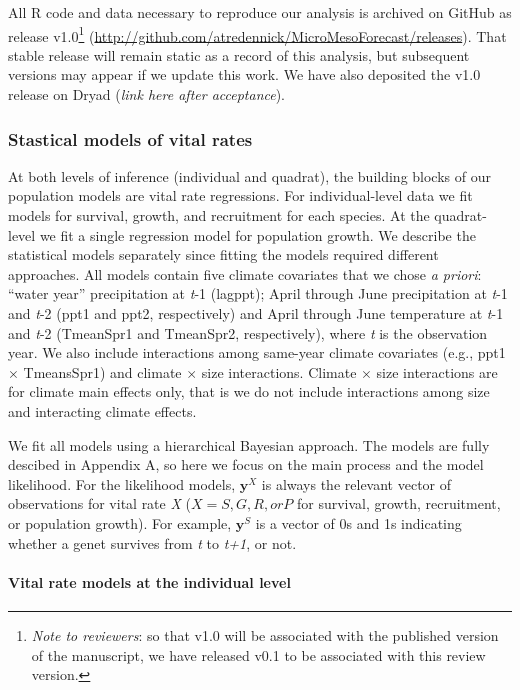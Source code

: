 \documentclass[12pt,]{article}
\begin{document}
All R code and data necessary to reproduce our analysis is archived on
GitHub as release v1.0\footnote{\emph{Note to reviewers}: so that v1.0
  will be associated with the published version of the manuscript, we
  have released v0.1 to be associated with this review version.}
(\url{http://github.com/atredennick/MicroMesoForecast/releases}). That
stable release will remain static as a record of this analysis, but
subsequent versions may appear if we update this work. We have also
deposited the v1.0 release on Dryad (\emph{link here after acceptance}).

\subsubsection{Stastical models of vital
rates}\label{stastical-models-of-vital-rates}

At both levels of inference (individual and quadrat), the building
blocks of our population models are vital rate regressions. For
individual-level data we fit models for survival, growth, and
recruitment for each species. At the quadrat-level we fit a single
regression model for population growth. We describe the statistical
models separately since fitting the models required different
approaches. All models contain five climate covariates that we chose
\emph{a priori}: ``water year'' precipitation at \emph{t}-1 (lagppt);
April through June precipitation at \emph{t}-1 and \emph{t}-2 (ppt1 and
ppt2, respectively) and April through June temperature at \emph{t}-1 and
\emph{t}-2 (TmeanSpr1 and TmeanSpr2, respectively), where \emph{t} is
the observation year. We also include interactions among same-year
climate covariates (e.g., ppt1 $\times$ TmeansSpr1) and climate $\times$
size interactions. Climate $\times$ size interactions are for climate
main effects only, that is we do not include interactions among size and
interacting climate effects.

We fit all models using a hierarchical Bayesian approach. The models are
fully descibed in Appendix A, so here we focus on the main process and
the model likelihood. For the likelihood models, $\textbf{y}^X$ is
always the relevant vector of observations for vital rate \emph{X}
($X = S, G, R, or P$ for survival, growth, recruitment, or population
growth). For example, $\textbf{y}^S$ is a vector of 0s and 1s indicating
whether a genet survives from \emph{t} to \emph{t+1}, or not.

\paragraph{Vital rate models at the individual
level}\label{vital-rate-models-at-the-individual-level}
\end{document}
